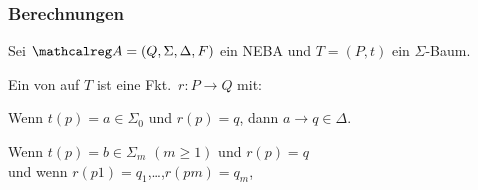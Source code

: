     \begin{frame}[t]
      \frametitle{Berechnungen }
      \begin{Definition}
        Sei $\Aut{A} = (Q,\Sigma,\Delta,F)$ ein NEBA und $T=(P,t)$ ein $\Sigma$-Baum.
        \begin{Itemize}
          \item
            Ein  von  auf $T$
            ist eine Fkt.\ $r : P \to Q$ mit:
            \begin{Itemize}
              \item
                Wenn $t(p) = a \in \Sigma_0$ und $r(p) = q$, dann $a \to q \in \Delta$.
              \item<2->
                Wenn $t(p) = b \in \Sigma_m$ $(m \geqslant 1)$ und $r(p) = q$ \\
                und wenn $r(p1) = q_1$,\quad \dots,\quad $r(pm) = q_m$,
                \par\smallskip
            \end{Itemize}
        \end{Itemize}
        \label{def:berechnung_NEBA}%
        \vspace*{-2mm}
      \end{Definition}
      
      \par\bigskip

    \end{frame}

